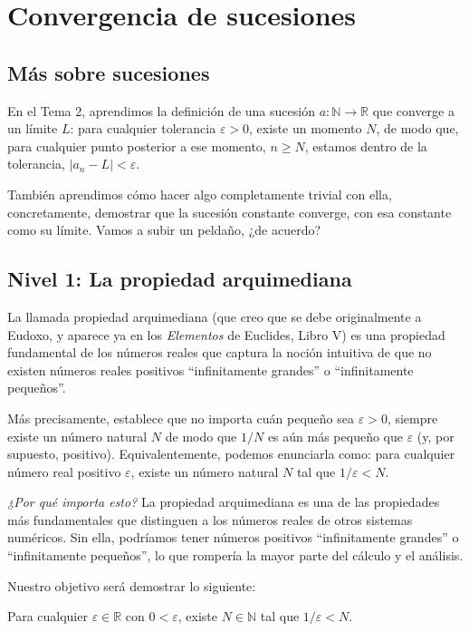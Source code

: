 \chapter{Convergencia de sucesiones}

\section{Más sobre sucesiones}

En el Tema 2, aprendimos la definición de una sucesión $a : \mathbb{N} \to \mathbb{R}$ que converge a un límite $L$: para cualquier tolerancia $\varepsilon > 0$, existe un momento $N$, de modo que, para cualquier punto posterior a ese momento, $n \ge N$, estamos dentro de la tolerancia, $|a_n - L| < \varepsilon$.

También aprendimos cómo hacer algo completamente trivial con ella, concretamente, demostrar que la sucesión constante converge, con esa constante como su límite. Vamos a subir un peldaño, ¿de acuerdo?


\section{Nivel 1: La propiedad arquimediana}

La llamada propiedad arquimediana (que creo que se debe originalmente a Eudoxo, y aparece ya en los \textit{Elementos} de Euclides, Libro V) es una propiedad fundamental de los números reales que captura la noción intuitiva de que no existen números reales positivos ``infinitamente grandes'' o ``infinitamente pequeños''.

Más precisamente, establece que no importa cuán pequeño sea $\varepsilon > 0$, siempre existe un número natural $N$ de modo que $1/N$ es aún más pequeño que $\varepsilon$ (y, por supuesto, positivo). Equivalentemente, podemos enunciarla como: para cualquier número real positivo $\varepsilon$, existe un número natural $N$ tal que $1/\varepsilon < N$.

\textit{¿Por qué importa esto?} La propiedad arquimediana es una de las propiedades más fundamentales que distinguen a los números reales de otros sistemas numéricos. Sin ella, podríamos tener números positivos ``infinitamente grandes'' o ``infinitamente pequeños'', lo que rompería la mayor parte del cálculo y el análisis.

Nuestro objetivo será demostrar lo siguiente:
\begin{theorem}[PropArq]
  Para cualquier $\varepsilon \in \mathbb{R}$ con $0 < \varepsilon$, existe $N \in \mathbb{N}$ tal que $1/\varepsilon < N$.
\end{theorem}

